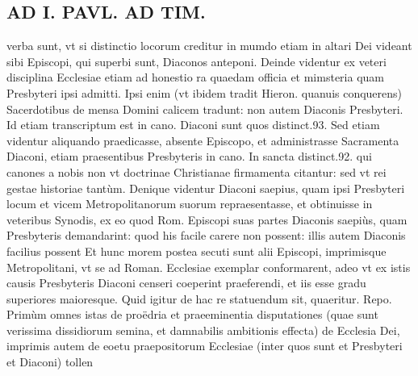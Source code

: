 \documentclass{article}
\begin{document}
\begin{pages}
\section*{AD I. PAVL. AD TIM. }
\marginpar{[ p.158 ]}\pstart verba sunt, vt si distinctio locorum creditur in mumdo etiam in altari Dei videant sibi Episcopi, qui superbi sunt, Diaconos anteponi. Deinde videntur ex veteri disciplina Ecclesiae etiam ad honestio ra quaedam officia et mimsteria quam Presbyteri ipsi admitti. Ipsi enim (vt ibidem tradit Hieron. quanuis conquerens) Sacerdotibus de mensa Domini calicem tradunt: non autem Diaconis Presbyteri. Id etiam transcriptum est in cano. Diaconi sunt quos distinct.93. Sed etiam videntur aliquando praedicasse, absente Episcopo, et administrasse Sacramenta Diaconi, etiam praesentibus Presbyteris in cano. In sancta distinct.92. qui canones a nobis non vt doctrinae Christianae firmamenta citantur: sed vt rei gestae historiae tantùm. Denique videntur Diaconi saepius, quam ipsi Presbyteri locum et vicem Metropolitanorum suorum repraesentasse, et obtinuisse in veteribus Synodis, ex eo quod Rom. Episcopi suas partes Diaconis saepiùs, quam Presbyteris demandarint: quod his facile carere non possent: illis autem Diaconis facilius possent Et hunc morem postea secuti sunt alii Episcopi, imprimisque Metropolitani, vt se ad Roman. Ecclesiae exemplar conformarent, adeo vt ex istis causis Presbyteris Diaconi censeri coeperint praeferendi, et iis esse gradu superiores maioresque. Quid igitur de hac re statuendum sit, quaeritur. Repo. Primùm omnes istas de proëdria et praeeminentia disputationes (quae sunt verissima dissidiorum semina, et damnabilis ambitionis effecta) de Ecclesia Dei, imprimis autem de eoetu praepositorum Ecclesiae (inter quos sunt et Presbyteri et Diaconi) tollen\pend

\end{pages}
\end{document}
